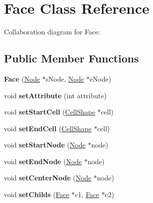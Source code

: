 \hypertarget{class_face}{}\section{Face Class Reference}
\label{class_face}


Collaboration diagram for Face\+:
\subsection*{Public Member Functions}
\begin{DoxyCompactItemize}
\item 
\mbox{\label{class_face_aaadda6c9b246fe1400a3e9952e1586ae}} 
{\bfseries Face} (\mbox{\hyperlink{class_node}{Node}} $\ast$s\+Node, \mbox{\hyperlink{class_node}{Node}} $\ast$e\+Node)
\item 
\mbox{\label{class_face_afe3cd81aef94f05fe0751d0764cbf882}} 
void {\bfseries set\+Attribute} (int attribute)
\item 
\mbox{\label{class_face_afb1f2efcd895a72faa31fc91da80933b}} 
void {\bfseries set\+Start\+Cell} (\mbox{\hyperlink{class_cell_shape}{Cell\+Shape}} $\ast$cell)
\item 
\mbox{\label{class_face_a94a6f03f01fef93d425eadc9b77a73e3}} 
void {\bfseries set\+End\+Cell} (\mbox{\hyperlink{class_cell_shape}{Cell\+Shape}} $\ast$cell)
\item 
\mbox{\label{class_face_a2cd4e5dd075f6d8271f58fd5b1732967}} 
void {\bfseries set\+Start\+Node} (\mbox{\hyperlink{class_node}{Node}} $\ast$node)
\item 
\mbox{\label{class_face_a0f95b0060780a3779a25cd7ce1e62db9}} 
void {\bfseries set\+End\+Node} (\mbox{\hyperlink{class_node}{Node}} $\ast$node)
\item 
\mbox{\label{class_face_a478883a26f64b074400bf993b4c85e88}} 
void {\bfseries set\+Center\+Node} (\mbox{\hyperlink{class_node}{Node}} $\ast$node)
\item 
\mbox{\label{class_face_a6a965ace8491507773bccf92475330ff}} 
void {\bfseries set\+Childs} (\mbox{\hyperlink{class_face}{Face}} $\ast$c1, \mbox{\hyperlink{class_face}{Face}} $\ast$c2)

\end{DoxyCompactItemize}
